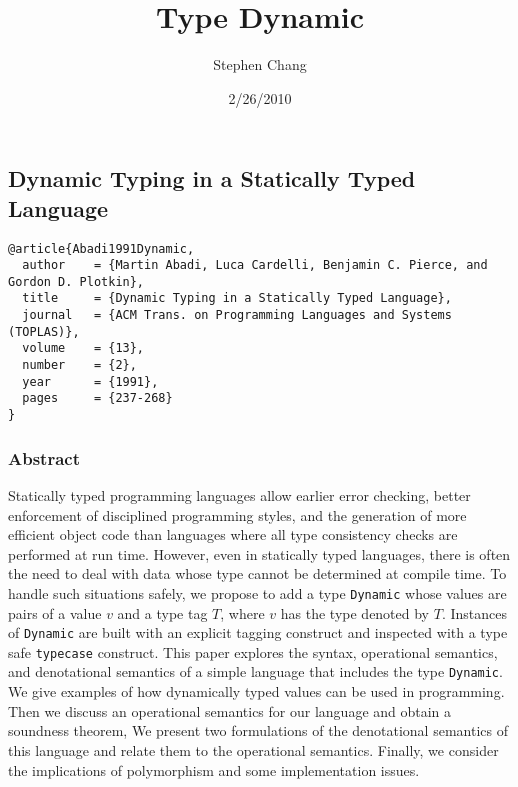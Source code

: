 \documentclass[12pt]{article}	%
\begin{document}
\newcommand{\Dynamic}{\texttt{Dynamic}\xspace}
\newcommand{\typecase}{\texttt{typecase}\xspace}
\newcommand{\dynamic}{\texttt{dynamic}\xspace}

\title{Type Dynamic}
\author{Stephen Chang}
\date{2/26/2010}
\maketitle

\subsection*{Dynamic Typing in a Statically Typed Language~\cite{Abadi1991Dynamic}}

\begin{verbatim}
@article{Abadi1991Dynamic,
  author    = {Martin Abadi, Luca Cardelli, Benjamin C. Pierce, and Gordon D. Plotkin},
  title     = {Dynamic Typing in a Statically Typed Language},
  journal   = {ACM Trans. on Programming Languages and Systems (TOPLAS)},
  volume    = {13},
  number    = {2},
  year      = {1991},
  pages     = {237-268}
}
\end{verbatim}

\subsubsection*{Abstract}
Statically typed programming languages allow earlier error checking, better enforcement of
disciplined programming styles, and the generation of more efficient object code than languages
where all type consistency checks are performed at run time. However, even in statically typed
languages, there is often the need to deal with data whose type cannot be determined at compile
time. To handle such situations safely, we propose to add a type \Dynamic whose values are
pairs of a value $v$ and a type tag $T$, where $v$ has the type denoted by $T$. Instances of \Dynamic
are built with an explicit tagging construct and inspected with a type safe \typecase construct.
This paper explores the syntax, operational semantics, and denotational semantics of a simple
language that includes the type \Dynamic. We give examples of how dynamically typed values
can be used in programming. Then we discuss an operational semantics for our language and
obtain a soundness theorem, We present two formulations of the denotational semantics of this
language and relate them to the operational semantics. Finally, we consider the implications of
polymorphism and some implementation issues.
\end{document}
